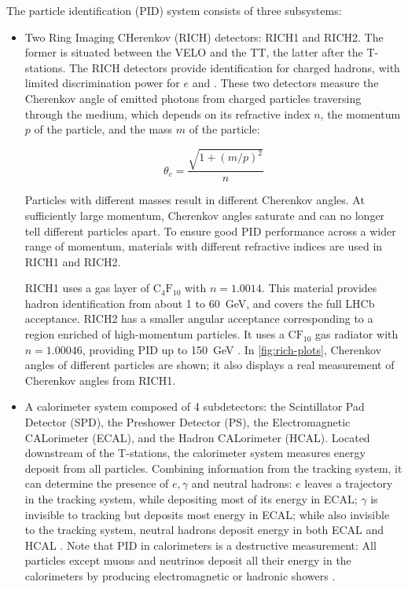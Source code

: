 The particle identification (PID) system consists of three subsystems:

\begin{itemize}
    \item Two Ring Imaging CHerenkov (RICH) detectors:
        RICH1 and RICH2.
        The former is situated between the VELO and the TT,
        the latter after the T-stations.
        The RICH detectors provide identification for charged hadrons,
        with limited discrimination power for $e$ and \muon.
        These two detectors measure the Cherenkov angle of emitted photons from
        charged particles traversing through the medium,
        which depends on its refractive index $n$,
        the momentum $p$ of the particle, and the mass $m$ of the particle:

        \begin{equation}
            \theta_c = \frac{\sqrt{1 + (m/p)^2}}{n}
        \end{equation}

        Particles with different masses result in different Cherenkov angles.
        At sufficiently large momentum,
        Cherenkov angles saturate and can no longer tell different particles
        apart.
        To ensure good PID performance across a wider range of momentum,
        materials with different refractive indices are used in RICH1 and RICH2.

        RICH1 uses a gas layer of $\text{C}_4 \text{F}_{10}$ with $n = 1.0014$.
        This material provides hadron identification from about 1 to 60~GeV,
        and covers the full LHCb acceptance.
        RICH2 has a smaller angular acceptance corresponding to a region enriched
        of high-momentum particles.
        It uses a $\text{C}\text{F}_{10}$ gas radiator with $n = 1.00046$,
        providing PID up to 150~GeV
        \cite{Belyaev_2021}.
        In \cref{fig:rich-plots}, Cherenkov angles of different particles are
        shown; it also displays a real measurement of Cherenkov angles from
        RICH1.

    \item A calorimeter system composed of 4 subdetectors:
        the Scintillator Pad Detector (SPD), the Preshower Detector (PS),
        the Electromagnetic CALorimeter (ECAL),
        and the Hadron CALorimeter (HCAL).
        Located downstream of the T-stations, the calorimeter system measures
        energy deposit from all particles.
        Combining information from the tracking system,
        it can determine the presence of $e, \gamma$ and neutral
        hadrons:
        $e$ leaves a trajectory in the tracking system, while depositing most
        of its energy in ECAL;
        $\gamma$ is invisible to tracking but deposits most energy in ECAL;
        while also invisible to the tracking system,
        neutral hadrons deposit energy in both ECAL and HCAL
        \cite{Belyaev_2021}.
        Note that PID in calorimeters is a destructive measurement:
        All particles except muons and neutrinos deposit all their energy
        in the calorimeters by producing electromagnetic or hadronic showers
        \cite{Lippmann_2012}.


\end{itemize}
